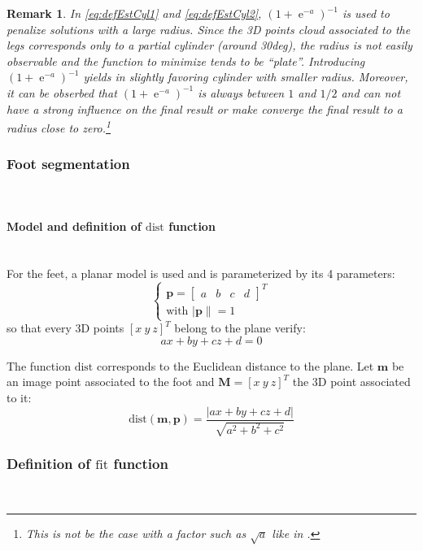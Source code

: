 \documentclass[letterpaper, 10 pt, conference]{ieeeconf}
\newtheorem{rem}{Remark}
\DeclareMathOperator{\e}{e}
\begin{document}
\begin{rem}
In \eqref{eq:defEstCyl1} and \eqref{eq:defEstCyl2}, $(1+\e^{-a})^{-1}$ is used to penalize solutions with a large radius. Since the 3D points cloud associated to the legs corresponds only to a partial cylinder (around 30deg), the radius is not easily observable and the function to minimize tends to be ``plate''. Introducing $(1+\e^{-a})^{-1}$ yields in slightly favoring cylinder with smaller radius. Moreover, it can be obserbed that $(1+\e^{-a})^{-1}$ is always between $1$ and $1/2$ and can not have a strong influence on the final result or make converge the final result to a radius close to zero.\footnote{This is not be the case with a factor such as $\sqrt{a}$ like in \cite{lala}.}
\end{rem}
\subsubsection{Foot segmentation}~\\
\label{subsub:footSegmentation}
\paragraph{Model and definition of $\mathrm{dist}$ function}~\\
For the feet, a planar model is used and is parameterized by its 4 parameters:
\begin{equation}
	\left\{
	\begin{array}{l}
		\mathbf{p} = 
		\begin{bmatrix}
			a & b & c & d
		\end{bmatrix}^T\\
	\mbox{with } |\mathbf{p}\| = 1 
	\end{array}
	\right.
\end{equation}
so that every 3D points $[x\ y\ z]^T$ belong to the plane verify:
\begin{equation}
	ax+by+cz+d=0
\end{equation}

The function $\mathrm{dist}$ corresponds to the Euclidean distance to the plane. Let $\mathbf{m}$ be an image point associated to the foot and $\mathbf{M} = [x\ y \ z]^T$ the 3D point associated to it:
\begin{equation}
	\mathrm{dist}(\mathbf{m},\mathbf{p}) = 
	\frac{|ax+by+cz+d|}
	{\sqrt{a^2+b^2+c^2}}
\end{equation}


\subsubsection{Definition of $\mathrm{fit}$ function}~\\
\end{document}
